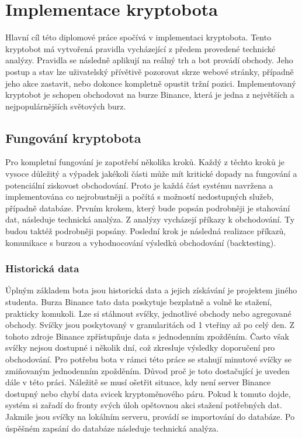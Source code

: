 \chapter{Implementace kryptobota}
\label{chap:impl}

Hlavní cíl této diplomové práce spočívá v implementaci kryptobota. Tento kryptobot má vytvořená pravidla vycházející z předem provedené technické analýzy.
Pravidla se následně aplikují na reálný trh a bot provádí obchody. Jeho postup a stav lze uživatelský přívětivě pozorovat skrze webové stránky, případně jeho akce
zastavit, nebo dokonce kompletně opustit tržní pozici. Implementovaný kryptobot je schopen obchodovat na burze Binance, která je jedna z největších a nejpopulárnějších
světových burz.

\section{Fungování kryptobota}
Pro kompletní fungování je zapotřebí několika kroků. Každý z těchto kroků je vysoce důležitý a výpadek jakékoli části může mít kritické dopady na fungování a potenciální ziskovost obchodování.
Proto je každá část systému navržena
a implementována co nejrobustněji a počítá s možností nedostupných služeb, případně databáze. Prvním krokem, který bude popsán podrobněji je stahování dat, následuje
technická analýza. Z analýzy vycházejí příkazy k obchodování. Ty budou taktéž podrobněji popsány. Poslední krok je následná realizace příkazů, komunikace s burzou
a vyhodnocování výsledků obchodování (backtesting).

\subsection{Historická data}
Úplným základem bota jsou historická data a jejich získávání je projektem jiného studenta. Burza Binance tato data poskytuje bezplatně a volně ke stažení, prakticky komukoli.
Lze si stáhnout svíčky,
jednotlivé obchody nebo agregované obchody. Svíčky jsou poskytovaný v granularitách od 1 vteřiny až po celý den. Z tohoto zdroje Binance zpřístupňuje data s jednodenním
zpožděním. Často však svíčky nejsou dostupné i několik dní, což zkresluje výsledky doporučení pro obchodování.
Pro potřebu bota v rámci této práce se stahují minutové svíčky se zmiňovaným jednodenním zpožděním. Důvod proč je toto dostačující je uveden dále v této práci.
Náležitě se musí ošetřit situace, kdy není server Binance dostupný nebo chybí data svicek kryptoměnového páru. Pokud k tomuto dojde, systém si zařadí do fronty svých úloh opětovnou
akci stažení potřebných dat. Jakmile jsou svíčky na lokálním serveru, provádí se importování do databáze. Po úspěšném zapsání do databáze následuje technická analýza.

